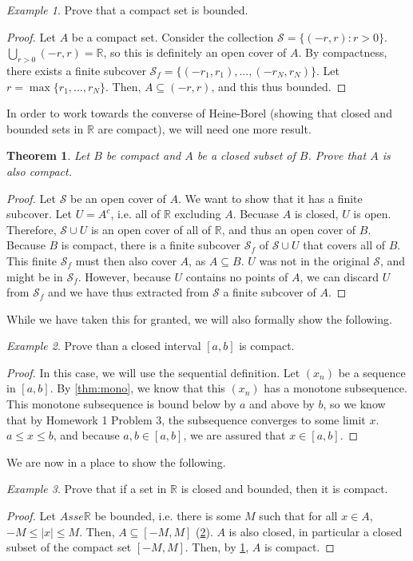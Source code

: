 \documentclass[11pt]{article}
\newcommand{\R}{\ensuremath{\mathbb R}}
\renewcommand{\S}{\ensuremath{\mathcal S}}
\newcommand{\sse}{\subseteq}
\theoremstyle{plain}
\newtheorem{thm}{Theorem}[section]
\theoremstyle{definition}
\theoremstyle{remark}
\newtheorem{exm}{Example}[section]
\begin{document}
\begin{exm}
    Prove that a compact set is bounded.
\end{exm}
\begin{proof}
    Let $A$ be a compact set. Consider the collection $\S = \{(-r, r) : r > 0\}$. $\bigcup _{r > 0} (-r, r) = \R$, so this is definitely an open cover of $A$. By compactness, there exists a finite subcover $\S_f = \{(-r_1, r_1), ..., (-r_N, r_N)\}$. Let $r = \max\{r_1, ..., r_N\}$. Then, $A \sse (-r ,r)$, and this thus bounded.
\end{proof}
In order to work towards the converse of Heine-Borel (showing that closed and bounded sets in $\R$ are compact), we will need one more result.
\begin{thm}
    Let $B$ be compact and $A$ be a closed subset of $B$. Prove that $A$ is also compact.
    \label{thm:subset}
\end{thm}
\begin{proof}
    Let $\S$ be an open cover of $A$. We want to show that it has a finite subcover. Let $U = A^c$, i.e. all of $\R$ excluding $A$. Becuase $A$ is closed, $U$ is open. Therefore, $\S \cup U$ is an open cover of all of $\R$, and thus an open cover of $B$. Because $B$ is compact, there is a finite subcover $\S_f$ of $\S \cup U$ that covers all of $B$. This finite $\S_f$ must then also cover $A$, as $A \sse B$. $U$ was not in the original $\S$, and might be in $\S_f$. However, because $U$ contains no points of $A$, we can discard $U$ from $\S_f$ and we have thus extracted from $\S$ a finite subcover of $A$.
\end{proof}
While we have taken this for granted, we will also formally show the following.
\begin{exm}
    Prove than a closed interval $[a, b]$ is compact. 
    \label{thm:interval}
\end{exm}
\begin{proof}
    In this case, we will use the sequential definition. Let $(x_n)$ be a sequence in $[a, b]$. By \ref{thm:mono}, we know that this $(x_n)$ has a monotone subsequence. This monotone subsequence is bound below by $a$ and above by $b$, so we know that by Homework 1 Problem 3, the subsequence converges to some limit $x$. $a \leq x \leq b$, and because $a, b \in [a, b]$, we are assured that $x \in [a, b]$. 
\end{proof}
We are now in a place to show the following.
\begin{exm}
    Prove that if a set in $\R$ is closed and bounded, then it is compact.
\end{exm}
\begin{proof}
    Let $A sse \R$ be bounded, i.e. there is some $M$ such that for all $x \in A$, $-M \leq |x| \leq M$. Then, $A \sse [-M, M]$ (\ref{thm:interval}). $A$ is also closed, in particular a closed subset of the compact set $[-M, M]$. Then, by \ref{thm:subset}, $A$ is compact.
\end{proof}
\end{document}
